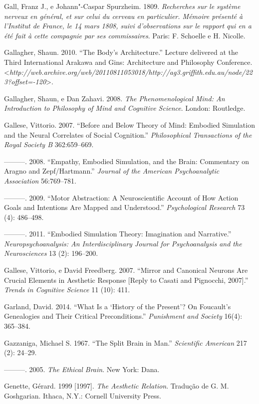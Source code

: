 Gall, Franz J., e Johann"-Caspar Spurzheim. 1809. \emph{Recherches sur le
système nerveux en général, et sur celui du cerveau en particulier.
Mémoire présenté à l'Institut de France, le 14 mars 1808, suivi
d'observations sur le rapport qui en a été fait à cette compagnie par
ses commissaires}. Paris: F. Schoelle e H. Nicolle.

Gallagher, Shaun. 2010. ``The Body's Architecture.'' Lecture delivered
at the Third International Arakawa and Gins: Architecture and Philosophy
Conference.
\textless{}\emph{http://web.archive.org/web/20110811053018/http://ag3.griffith.edu.au/node/223?offset=-120}\textgreater{}.

Gallagher, Shaun, e Dan Zahavi. 2008. \emph{The Phenomenological Mind:
An Introduction to Philosophy of Mind and Cognitive Science}. London:
Routledge.

Gallese, Vittorio. 2007. ``Before and Below Theory of Mind: Embodied
Simulation and the Neural Correlates of Social Cognition.''
\emph{Philosophical Transactions of the Royal Society B} 362:659--669.

---------. 2008. ``Empathy, Embodied Simulation, and the Brain:
Commentary on Aragno and Zepf/Hartmann.'' \emph{Journal of the American
Psychoanalytic Association} 56:769--781.

---------. 2009. ``Motor Abstraction: A Neuroscientific Account of How
Action Goals and Intentions Are Mapped and Understood.''
\emph{Psychological Research} 73 (4): 486--498.

---------. 2011. ``Embodied Simulation Theory: Imagination and
Narrative.'' \emph{Neuropsychoanalysis: An Interdisciplinary Journal for
Psychoanalysis and the Neurosciences} 13 (2): 196--200.

Gallese, Vittorio, e David Freedberg. 2007. ``Mirror and Canonical
Neurons Are Crucial Elements in Aesthetic Response {[}Reply to Casati
and Pignocchi, 2007{]}.'' \emph{Trends in Cognitive Science} 11 (10):
411.

Garland, David. 2014. ``What Is a `History of the Present'? On
Foucault's Genealogies and Their Critical Preconditions.''
\emph{Punishment and Society} 16(4): 365--384.

Gazzaniga, Michael S. 1967. ``The Split Brain in Man.'' \emph{Scientific
American} 217 (2): 24--29.

---------. 2005. \emph{The Ethical Brain}. New York: Dana.

Genette, Gérard. 1999 {[}1997{]}. \emph{The Aesthetic Relation}.
Tradução de G. M. Goshgarian. Ithaca, N.Y.: Cornell University Press.

